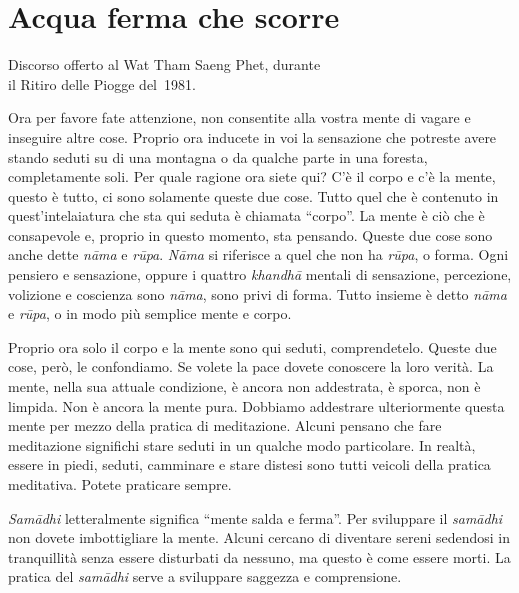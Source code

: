 \chapter{Acqua ferma che scorre}

\begin{openingQuote}
  \centering

  Discorso offerto al Wat Tham Saeng Phet, durante\\
  il Ritiro delle Piogge del~1981.
\end{openingQuote}

Ora per favore fate attenzione, non consentite alla vostra mente di
vagare e inseguire altre cose. Proprio ora inducete in voi la sensazione
che potreste avere stando seduti su di una montagna o da qualche parte
in una foresta, completamente soli. Per quale ragione ora siete qui? C'è
il corpo e c'è la mente, questo è tutto, ci sono solamente queste due
cose. Tutto quel che è contenuto in quest'intelaiatura che sta qui
seduta è chiamata ``corpo''. La mente è ciò che è consapevole e, proprio
in questo momento, sta pensando. Queste due cose sono anche dette
\emph{nāma} e \emph{rūpa}. \emph{Nāma} si riferisce a quel che non ha
\emph{rūpa}, o forma. Ogni pensiero e sensazione, oppure i quattro
\emph{khandhā} mentali di sensazione, percezione, volizione e coscienza
sono \emph{nāma}, sono privi di forma. Tutto insieme è detto \emph{nāma}
e \emph{rūpa}, o in modo più semplice mente e corpo.

Proprio ora solo il corpo e la mente sono qui seduti, comprendetelo.
Queste due cose, però, le confondiamo. Se volete la pace dovete
conoscere la loro verità. La mente, nella sua attuale condizione, è
ancora non addestrata, è sporca, non è limpida. Non è ancora la mente
pura. Dobbiamo addestrare ulteriormente questa mente per mezzo della
pratica di meditazione. Alcuni pensano che fare meditazione significhi
stare seduti in un qualche modo particolare. In realtà, essere in piedi,
seduti, camminare e stare distesi sono tutti veicoli della pratica
meditativa. Potete praticare sempre.

\emph{Samādhi} letteralmente
significa ``mente salda e ferma''. Per sviluppare il \emph{samādhi} non
dovete imbottigliare la mente. Alcuni cercano di diventare sereni
sedendosi in tranquillità senza essere disturbati da nessuno, ma questo
è come essere morti. La pratica del \emph{samādhi} serve a sviluppare
saggezza e comprensione.


